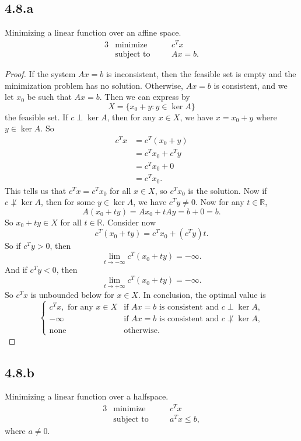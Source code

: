 \documentclass[12pt]{article}
\newcommand{\R}{\mathbb{R}}
\begin{document}
\subsection*{4.8.a}
Minimizing a linear function over an affine space.
\begin{alignat*}{3}
    &\text{minimize}    &\quad& c^Tx \\
    &\text{subject to}  &\quad& Ax=b.
\end{alignat*}

\begin{proof}
    If the system $Ax=b$ is inconsistent, then the feasible set is empty and the minimization problem has no solution. Otherwise, $Ax=b$ is consistent, and we let $x_0$ be such that $Ax=b$. Then we can express by 
    \[X = \{x_0+y : y\in\ker A\}\]
    the feasible set. If $c\perp\ker A$, then for any $x\in X$, we have $x=x_0+y$ where $y\in\ker A$. So
    \begin{align*}
        c^Tx
            &= c^T(x_0 + y) \\
            &= c^Tx_0 + c^Ty \\
            &= c^Tx_0 + 0 \\
            &= c^Tx_0.
    \end{align*}
    This tells us that $c^Tx=c^Tx_0$ for all $x\in X$, so $c^Tx_0$ is the solution. Now if $c\not\perp\ker A$, then for some $y\in\ker A$, we have $c^Ty\ne0$. Now for any $t\in\R$,
    \[A(x_0+ty) = Ax_0 + tAy = b + 0 = b.\]
    So $x_0+ty\in X$ for all $t\in\R$. Consider now
    \[c^T(x_0+ty) = c^Tx_0 + (c^Ty)t.\]
    So if $c^Ty>0$, then
    \[\lim_{t\to-\infty}c^T(x_0+ty) = -\infty.\]
    And if $c^Ty<0$, then
    \[\lim_{t\to+\infty}c^T(x_0+ty) = -\infty.\]
    So $c^Tx$ is unbounded below for $x\in X$. In conclusion, the optimal value is
    \[\begin{cases}
        c^Tx, \text{ for any } x\in X &\text{if } Ax=b \text{ is consistent and } c\perp\ker A, \\
        -\infty &\text{if } Ax=b \text{ is consistent and } c\not\perp\ker A, \\
        \text{none} &\text{otherwise.}
    \end{cases}\]

\end{proof}



\subsection*{4.8.b}
Minimizing a linear function over a halfspace.
\begin{alignat*}{3}
    &\text{minimize}    &\quad& c^Tx \\
    &\text{subject to}  &\quad& a^Tx\leq b,
\end{alignat*}
where $a\ne0$.
\end{document}
